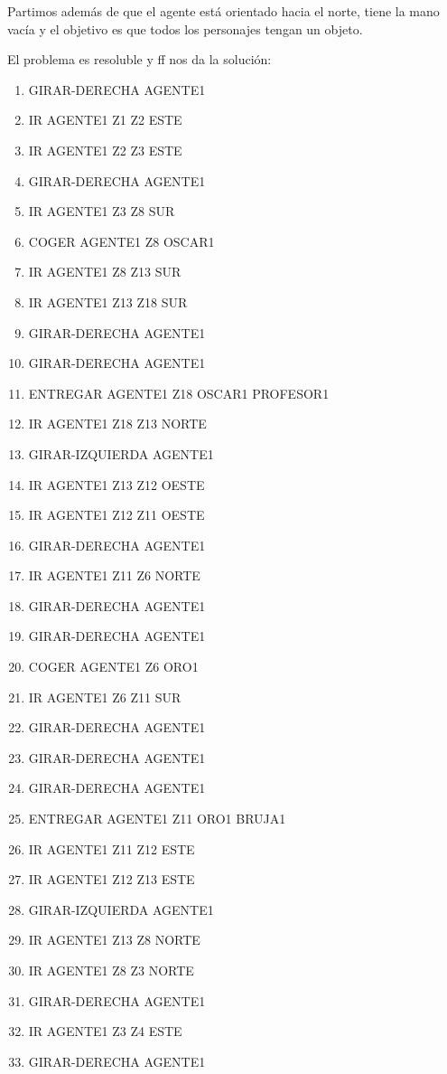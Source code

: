 \documentclass[12pt,a4paper]{article}
\begin{document}
Partimos además de que el agente está orientado hacia el norte, tiene la mano vacía y el objetivo es que todos los personajes tengan un objeto.

El problema es resoluble y ff nos da la solución:
\begin{enumerate}
	\item GIRAR-DERECHA AGENTE1
	\item IR AGENTE1 Z1 Z2 ESTE
	\item IR AGENTE1 Z2 Z3 ESTE
	\item GIRAR-DERECHA AGENTE1
	\item IR AGENTE1 Z3 Z8 SUR
	\item COGER AGENTE1 Z8 OSCAR1
	\item IR AGENTE1 Z8 Z13 SUR
	\item IR AGENTE1 Z13 Z18 SUR
	\item GIRAR-DERECHA AGENTE1
	\item GIRAR-DERECHA AGENTE1
	\item ENTREGAR AGENTE1 Z18 OSCAR1 PROFESOR1
	\item IR AGENTE1 Z18 Z13 NORTE
	\item GIRAR-IZQUIERDA AGENTE1
	\item IR AGENTE1 Z13 Z12 OESTE
	\item IR AGENTE1 Z12 Z11 OESTE
	\item GIRAR-DERECHA AGENTE1
	\item IR AGENTE1 Z11 Z6 NORTE
	\item GIRAR-DERECHA AGENTE1
	\item GIRAR-DERECHA AGENTE1
	\item COGER AGENTE1 Z6 ORO1
	\item IR AGENTE1 Z6 Z11 SUR
	\item GIRAR-DERECHA AGENTE1
	\item GIRAR-DERECHA AGENTE1
	\item GIRAR-DERECHA AGENTE1
	\item ENTREGAR AGENTE1 Z11 ORO1 BRUJA1
	\item IR AGENTE1 Z11 Z12 ESTE
	\item IR AGENTE1 Z12 Z13 ESTE
	\item GIRAR-IZQUIERDA AGENTE1
	\item IR AGENTE1 Z13 Z8 NORTE
	\item IR AGENTE1 Z8 Z3 NORTE
	\item GIRAR-DERECHA AGENTE1
	\item IR AGENTE1 Z3 Z4 ESTE
	\item GIRAR-DERECHA AGENTE1

\end{enumerate}
\end{document}
